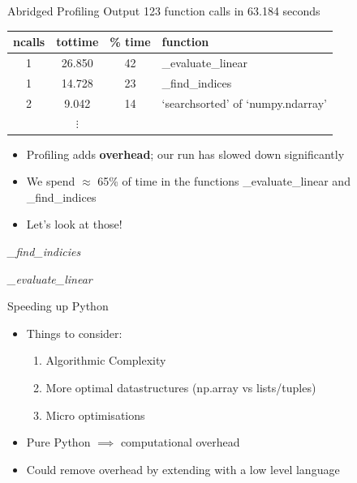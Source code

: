 \documentclass[12pt,xcolor=dvipsnames]{beamer}
\begin{document}
    \begin{frame}{Abridged Profiling Output}
        123 function calls in 63.184 seconds
        \begin{center}
        \begin{tabular}{ | c | c | c | l |}
            \hline
            ncalls & tottime & \% time & function \\
            \hline
            1 & 26.850 & 42 & \_evaluate\_linear \\
            1 & 14.728 & 23 & \_find\_indices \\
            2 & 9.042 & 14 & `searchsorted' of `numpy.ndarray' \\
            & $\vdots$ & & \\
            \hline
        \end{tabular}
        \end{center}
        \begin{itemize}
            \item<2-> Profiling adds \textbf{overhead}; our run has slowed down significantly
            \item<2-> We spend $\approx$ 65\% of time in the functions \_evaluate\_linear and \_find\_indices
            \item<2-> Let's look at those!
        \end{itemize}
    \end{frame}

    \begin{frame}{\textit{\_find\_indicies}}
        
    \end{frame}

    \begin{frame}{\textit{\_evaluate\_linear}}
        
    \end{frame}

    \begin{frame}{Speeding up Python}
        \begin{itemize}
            \item Things to consider:
            \begin{enumerate}
                \item Algorithmic Complexity
                \item More optimal datastructures (np.array vs lists/tuples)
                \item Micro optimisations
            \end{enumerate}
            \item Pure Python $\implies$ computational overhead
            \item Could remove overhead by extending with a low level language
        \end{itemize}
    \end{frame}
\end{document}
